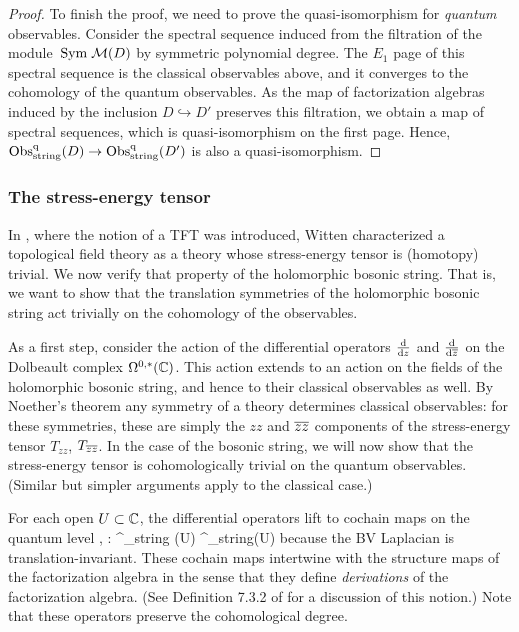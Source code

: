 \begin{proof}
To finish the proof, we need to prove the quasi-isomorphism for {\em quantum} observables.
Consider the spectral sequence induced from the filtration of the module~${\rm Sym} \;\mathcal M(D)$ by symmetric polynomial degree. 
The $E_1$ page of this spectral sequence is the classical observables above, 
and it converges to the cohomology of the quantum observables. 
As the map of factorization algebras induced by the inclusion $D \hookrightarrow D'$ preserves this filtration, 
we obtain a map of spectral sequences,
which is quasi-isomorphism on the first page.
Hence, ${\rm Obs}^{{\rm q}}_{\rm string}(D) \to {\rm Obs}^{\rm q}_{\rm string}(D')$ is also a quasi-isomorphism. 
\end{proof}

\subsubsection{The stress-energy tensor}

In \cite{WittenTop}, where the notion of a TFT was introduced,
Witten characterized a topological field theory
as a theory whose stress-energy tensor is (homotopy) trivial. 
We now verify that property of the holomorphic bosonic string.
That is, we want to show that the translation symmetries of the holomorphic bosonic string act trivially on the cohomology of the observables.

As a first step, consider the action of the differential operators $\frac{{\rm d}}{{\rm d} z}$ and $\frac{{\rm d}}{{\rm d} \overline{z}}$ on the Dolbeault complex $\Omega^{0,*}(\mathbb C)$. 
This action extends to an action on the fields of the holomorphic bosonic string, and hence to their classical observables as well. 
By Noether's theorem any symmetry of a theory determines classical observables: 
for these symmetries, these are simply the $zz$ and $\overline{z} \overline{z}$ components of the stress-energy tensor $T_{zz}$, $T_{\overline{z} \overline{z}}$. 
In the case of the bosonic string, we will now show that the stress-energy tensor is cohomologically trivial on the quantum observables.
(Similar but simpler arguments apply to the classical case.)

For each open $U \subset \mathbb C$, the differential operators lift to cochain maps on the quantum level
\ben
{} , \frac{\d}{\d \zbar} : \Obs^\q_{\rm string} (U) \to \Obs^\q_{\rm string}(U) 
\een 
because the BV Laplacian is translation-invariant.
These cochain maps intertwine with the structure maps of the factorization algebra 
in the sense that they define {\em derivations} of the factorization algebra. 
(See Definition 7.3.2 of \cite{CG1} for a discussion of this notion.)
Note that these operators preserve the cohomological degree. 

